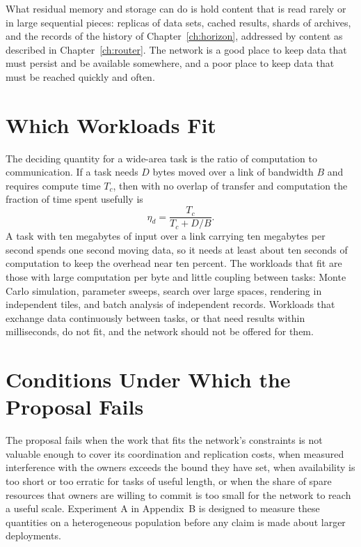 What residual memory and storage can do is hold content that is read rarely or in large sequential pieces: replicas of data sets, cached results, shards of archives, and the records of the history of Chapter~\ref{ch:horizon}, addressed by content as described in Chapter~\ref{ch:router}. The network is a good place to keep data that must persist and be available somewhere, and a poor place to keep data that must be reached quickly and often.

\section{Which Workloads Fit}

The deciding quantity for a wide-area task is the ratio of computation to communication. If a task needs $D$ bytes moved over a link of bandwidth $B$ and requires compute time $T_c$, then with no overlap of transfer and computation the fraction of time spent usefully is
\[
\eta_d=\frac{T_c}{T_c+D/B}.
\]
A task with ten megabytes of input over a link carrying ten megabytes per second spends one second moving data, so it needs at least about ten seconds of computation to keep the overhead near ten percent. The workloads that fit are those with large computation per byte and little coupling between tasks: Monte Carlo simulation, parameter sweeps, search over large spaces, rendering in independent tiles, and batch analysis of independent records. Workloads that exchange data continuously between tasks, or that need results within milliseconds, do not fit, and the network should not be offered for them.

\section{Conditions Under Which the Proposal Fails}

The proposal fails when the work that fits the network's constraints is not valuable enough to cover its coordination and replication costs, when measured interference with the owners exceeds the bound they have set, when availability is too short or too erratic for tasks of useful length, or when the share of spare resources that owners are willing to commit is too small for the network to reach a useful scale. Experiment A in Appendix~B is designed to measure these quantities on a heterogeneous population before any claim is made about larger deployments.
